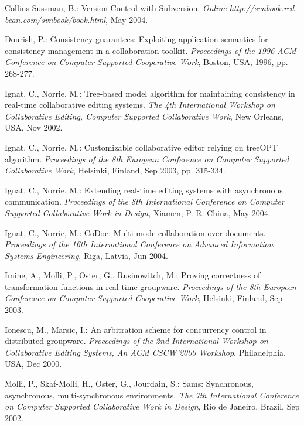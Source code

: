 \begin{thebibliography}{99}

 Collins-Sussman, B.: Version Control with Subversion.
\textit{Online http://svnbook.red-bean.com/svnbook/book.html}, May 2004.

 Dourish, P.: Consistency guarantees: Exploiting application semantics for consistency management in a collaboration toolkit.
\textit{Proceedings of the 1996 ACM Conference on Computer-Supported Cooperative Work}, Boston, USA, 1996, pp. 268-277.

 Ignat, C., Norrie, M.: Tree-based model algorithm for maintaining consistency in real-time collaborative editing systems.
\textit{The 4th International Workshop on Collaborative Editing, Computer Supported Collaborative Work}, New Orleans, USA, Nov 2002.

 Ignat, C., Norrie, M.: Customizable collaborative editor relying on treeOPT algorithm.
\textit{Proceedings of the 8th European Conference on Computer Supported Collaborative Work}, Helsinki, Finland, Sep 2003, pp. 315-334.

 Ignat, C., Norrie, M.: Extending real-time editing systems with asynchronous communication.
\textit{Proceedings of the 8th International Conference on Computer Supported Collaborative Work in Design}, Xiamen, P. R. China, May 2004.

 Ignat, C., Norrie, M.: CoDoc: Multi-mode collaboration over documents.
\textit{Proceedings of the 16th International Conference on Advanced Information Systems Engineering}, Riga, Latvia, Jun 2004.

 Imine, A., Molli, P., Oster, G., Rusinowitch, M.: Proving correctness of transformation functions in real-time groupware.
\textit{Proceedings of the 8th European Conference on Computer-Supported Cooperative Work}, Helsinki, Finland, Sep 2003.

 Ionescu, M., Marsic, I.: An arbitration scheme for concurrency control in distributed groupware.
\textit{Proceedings of the 2nd International Workshop on Collaborative Editing Systems, An ACM CSCW'2000 Workshop}, Philadelphia, USA, Dec 2000.

 Molli, P., Skaf-Molli, H., Oster, G., Jourdain, S.:  Sams: Synchronous, asynchronous, multi-synchronous environments.
\textit{The 7th International Conference on Computer Supported Collaborative Work in Design}, Rio de Janeiro, Brazil, Sep 2002.


\end{thebibliography}
